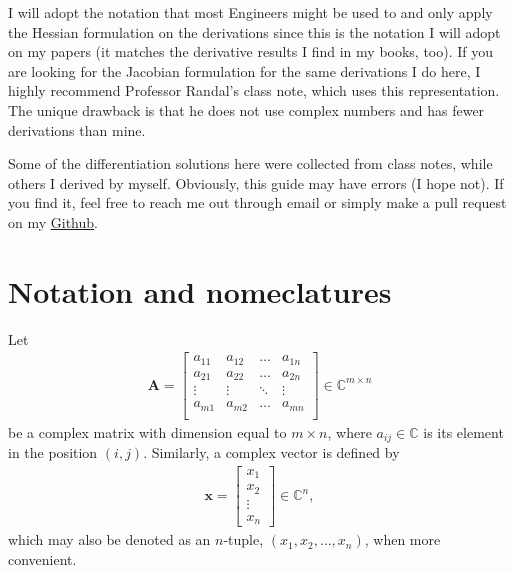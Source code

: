 \documentclass{article}
\begin{document}
I will adopt the notation that most Engineers might be used to and only apply the Hessian formulation on the derivations since this is the notation I will adopt on my papers (it matches the derivative results I find in my books, too). If you are looking for the Jacobian formulation for the same derivations I do here, I highly recommend Professor Randal's class note, which uses this representation. The unique drawback is that he does not use complex numbers and has fewer derivations than mine.

Some of the differentiation solutions here were collected from class notes, while others I derived by myself. Obviously, this guide may have errors (I hope not). If you find it, feel free to reach me out through email or simply make a pull request on my \href{https://github.com/tapyu/courses/tree/main/matrix_diff_ref}{Github}.

\section{Notation and nomeclatures}
\label{sec:notation}

Let
\begin{align}
    \mathbf{A} = \begin{bmatrix}
        a_{11} & a_{12} & \dots & a_{1n} \\
        a_{21} & a_{22} & \dots & a_{2n} \\
        \vdots & \vdots & \ddots & \vdots \\
        a_{m1} & a_{m2} & \dots & a_{mn} \\
    \end{bmatrix} \in \mathbb{C}^{m \times n}
\end{align}
be a complex matrix with dimension equal to \(m \times n\), where \(a_{ij} \in \mathbb{C}\) is its element in the position \((i,j)\). Similarly, a complex vector is defined by
\begin{align}
    \mathbf{x} = \begin{bmatrix}
        x_1 \\
        x_2 \\
        \vdots \\
        x_n
    \end{bmatrix}  \in \mathbb{C}^{n},
\end{align}
which may also be denoted as an \(n\)-tuple, \((x_1, x_2, \dots, x_n)\), when more convenient.
\end{document}
